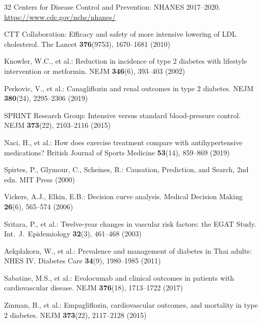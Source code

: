 \documentclass[runningheads]{llncs}
\begin{document}
\begin{thebibliography}{32}
Centers for Disease Control and Prevention:
NHANES 2017--2020.
\url{https://www.cdc.gov/nchs/nhanes/}

CTT Collaboration:
Efficacy and safety of more intensive lowering of LDL cholesterol.
The Lancet \textbf{376}(9753), 1670--1681 (2010)

Knowler, W.C., et al.:
Reduction in incidence of type 2 diabetes with lifestyle intervention or metformin.
NEJM \textbf{346}(6), 393--403 (2002)

Perkovic, V., et al.:
Canagliflozin and renal outcomes in type 2 diabetes.
NEJM \textbf{380}(24), 2295--2306 (2019)

SPRINT Research Group:
Intensive versus standard blood-pressure control.
NEJM \textbf{373}(22), 2103--2116 (2015)

Naci, H., et al.:
How does exercise treatment compare with antihypertensive medications?
British Journal of Sports Medicine \textbf{53}(14), 859--869 (2019)

Spirtes, P., Glymour, C., Scheines, R.:
Causation, Prediction, and Search, 2nd edn.
MIT Press (2000)

Vickers, A.J., Elkin, E.B.:
Decision curve analysis.
Medical Decision Making \textbf{26}(6), 565--574 (2006)

Sritara, P., et al.:
Twelve-year changes in vascular risk factors: the EGAT Study.
Int.\ J.\ Epidemiology \textbf{32}(3), 461--468 (2003)

Aekplakorn, W., et al.:
Prevalence and management of diabetes in Thai adults: NHES IV.
Diabetes Care \textbf{34}(9), 1980--1985 (2011)

Sabatine, M.S., et al.:
Evolocumab and clinical outcomes in patients with cardiovascular disease.
NEJM \textbf{376}(18), 1713--1722 (2017)

Zinman, B., et al.:
Empagliflozin, cardiovascular outcomes, and mortality in type 2 diabetes.
NEJM \textbf{373}(22), 2117--2128 (2015)

\end{thebibliography}
\end{document}
